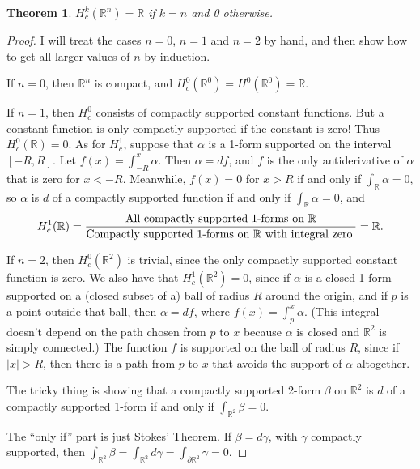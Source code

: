 \documentclass[12pt]{amsbook}
\newcommand{\R}{{\mathbb R}}
\newtheorem{thm}{Theorem}[section]
\theoremstyle{definition}
\begin{document}
\begin{thm} $H^k_c(\R^n)=\R$ if $k=n$ and 0 otherwise. \end{thm}

\begin{proof} I will treat the cases $n=0$, $n=1$ and $n=2$ by hand,
  and then show how to get all larger values of $n$ by induction.

If $n=0$, then $\R^n$ is compact, and $H^0_c(\R^0)=H^0(\R^0)=\R$. 

If $n=1$, then $H^0_c$ consists of compactly supported constant
functions. But a constant function is only compactly supported if the
constant is zero! Thus $H^0_c(\R)=0$. As for $H^1_c$, suppose that
$\alpha$ is a 1-form supported on the interval $[-R,R]$. Let $f(x) =
\int_{-R}^x \alpha$. Then $\alpha =df$, and $f$ is the only
antiderivative of $\alpha$ that is zero for $x<-R$.
Meanwhile, $f(x)=0$ for $x>R$ if and only if $\int_\R \alpha =0$, so 
$\alpha$ is $d$ of a compactly supported function if and
only if $\int_\R \alpha = 0$, and
$$ H^1_c(\R) = \frac{\hbox{All compactly supported 1-forms on $\R$}}{\hbox{Compactly supported 1-forms on $\R$
with integral zero.}} = \R.$$

If $n=2$, then $H^0_c(\R^2)$ is trivial, since the only compactly
supported constant function is zero. We also have that
$H^1_c(\R^2)=0$, since if $\alpha$ is a closed 1-form supported on a
(closed subset of a) ball of radius $R$ around the origin, and if $p$
is a point outside that ball, then $\alpha = df$, where $f(x) =
\int_p^x \alpha$. (This integral doesn't depend on the path chosen
from $p$ to $x$ because $\alpha$ is closed and $\R^2$ is simply
connected.)  The function $f$ is supported on the ball of radius $R$,
since if $|x|>R$, then there is a path from $p$ to $x$ that avoids the
support of $\alpha$ altogether.

The tricky thing is showing that a compactly supported 2-form $\beta$
on $\R^2$ is $d$ of a compactly supported 1-form if and only if
$\int_{\R^2} \beta = 0$.

The ``only if'' part is just Stokes' Theorem. If $\beta = d\gamma$,
with $\gamma$ compactly supported, then $\int_{\R^2} \beta =
\int_{\R^2} d\gamma = \int_{\partial\R^2}\gamma= 0$.


\end{proof}
\end{document}
